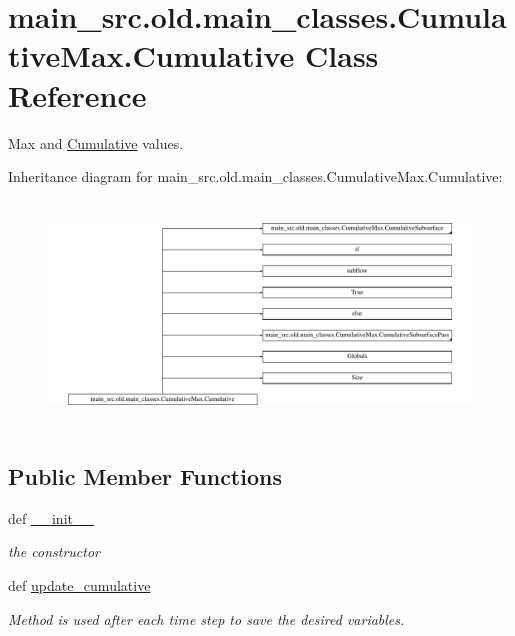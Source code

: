 \hypertarget{classmain__src_8old_1_1main__classes_1_1CumulativeMax_1_1Cumulative}{\section{main\-\_\-src.\-old.\-main\-\_\-classes.\-Cumulative\-Max.\-Cumulative Class Reference}
\label{classmain__src_8old_1_1main__classes_1_1CumulativeMax_1_1Cumulative}
}


Max and \hyperlink{classmain__src_8old_1_1main__classes_1_1CumulativeMax_1_1Cumulative}{Cumulative} values.  


Inheritance diagram for main\-\_\-src.\-old.\-main\-\_\-classes.\-Cumulative\-Max.\-Cumulative\-:\begin{figure}[H]
\begin{center}
\leavevmode
\includegraphics[height=6.014319cm]{classmain__src_8old_1_1main__classes_1_1CumulativeMax_1_1Cumulative}
\end{center}
\end{figure}
\subsection*{Public Member Functions}
\begin{DoxyCompactItemize}
\item 
def \hyperlink{classmain__src_8old_1_1main__classes_1_1CumulativeMax_1_1Cumulative_aebc2cb646fa1463f5c3fa27edf8f24a2}{\-\_\-\-\_\-init\-\_\-\-\_\-}
\begin{DoxyCompactList}\small\item\em the constructor \end{DoxyCompactList}\item 
def \hyperlink{classmain__src_8old_1_1main__classes_1_1CumulativeMax_1_1Cumulative_a0e539cb812b917f76009784754c4e82b}{update\-\_\-cumulative}
\begin{DoxyCompactList}\small\item\em Method is used after each time step to save the desired variables. \end{DoxyCompactList}\end{DoxyCompactItemize}
